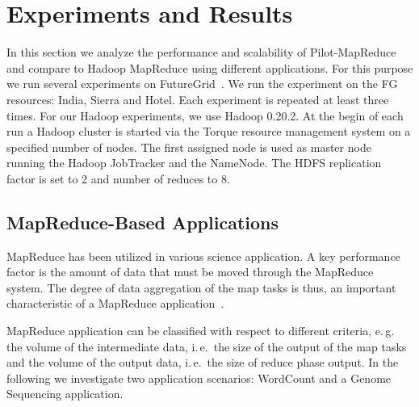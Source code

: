 \documentclass{acm_proc_article-sp}
\newcommand{\pilotmapreduce}{Pilot-MapReduce\xspace}
\begin{document}

\section{Experiments and Results}
\label{sec-experiments}


In this section we analyze the performance and scalability of  \pilotmapreduce and compare to Hadoop MapReduce using different applications.
For this purpose we run several experiments on FutureGrid~\cite{fg}. We run the
experiment on the FG resources: India, Sierra and Hotel. Each experiment is
repeated at least three times. For our Hadoop experiments, we use Hadoop 0.20.2. At the begin of each run a 
Hadoop cluster is started via the Torque resource management system on a
specified number of nodes. The first assigned node is used as master node
running the Hadoop JobTracker and the NameNode. The HDFS replication factor is 
set to 2 and number of reduces to 8.

\subsection{MapReduce-Based Applications}

MapReduce has been utilized in various science application. A key performance 
factor is the amount of data that must be moved through the MapReduce system. 
The degree of data aggregation of the map tasks is thus, an important 
characteristic of a MapReduce application~\cite{weissman-mr-11}.

MapReduce application can be classified with respect to different criteria,
e.\,g.\, the volume of the intermediate data, i.\,e.\ the size of the output
of the map tasks and the volume of the output data, i.\,e.\ the size of reduce
phase output. In the following we investigate two application scenarios: 
WordCount and a Genome Sequencing application.
\end{document}
